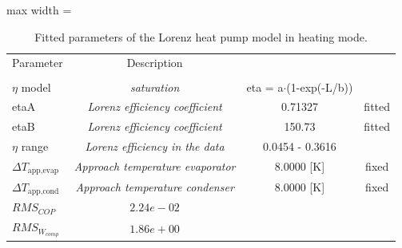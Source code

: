 \documentclass[english]{SPFShortReport}
\author{mikel.arenas}
\begin{document}
\begin{table}[!ht]
\centering
\caption{Fitted parameters of the Lorenz heat pump model in heating mode.}
\begin{adjustbox}{max width =\textwidth}
\begin{tabular}{l | c c c } 
\hline
\hline
Parameter &Description & & \\ 
 & & &\\ 
\hline
$\eta$ model & \emph{saturation} & eta = a$\cdot$(1-exp(-L/b)) & \\ 
etaA & \emph{Lorenz efficiency coefficient} & 0.71327 & fitted \\ 
etaB & \emph{Lorenz efficiency coefficient} & 150.73 & fitted \\ 
$\eta$ range & \emph{Lorenz efficiency in the data} & 0.0454 - 0.3616 & \\ 
$\Delta T_\text{app,evap}$ & \emph{Approach temperature evaporator} & 8.0000 [K] & fixed \\ 
$\Delta T_\text{app,cond}$ & \emph{Approach temperature condenser} & 8.0000 [K] & fixed \\ 
\hline
 $RMS_{COP}$ & $2.24e-02$ \\ 
 $RMS_{W_{comp}}$ & $1.86e+00$ \\ 
\hline
\hline
\hline
\end{tabular}
\end{adjustbox}
\label{ParTable}
\end{table}
\end{document}
